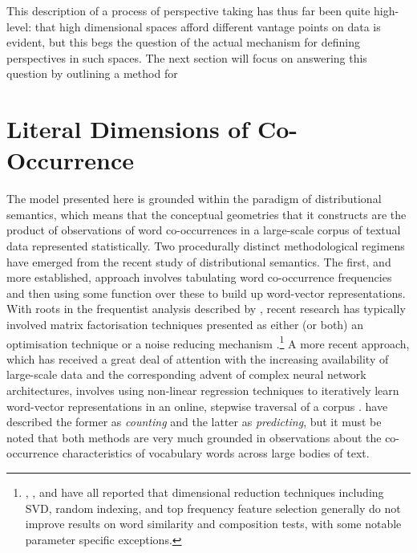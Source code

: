 {This description of a process of perspective taking has thus far been quite high-level: that high dimensional spaces afford different vantage points on data is evident, but this begs the question of the actual mechanism for defining perspectives in such spaces.  The next section will focus on answering this question by outlining a method for 

\section{Literal Dimensions of Co-Occurrence}
The model presented here is grounded within the paradigm of distributional semantics, which means that the conceptual geometries that it constructs are the product of observations of word co-occurrences in a large-scale corpus of textual data represented statistically.  Two procedurally distinct methodological regimens have emerged from the recent study of distributional semantics.  The first, and more established, approach involves tabulating word co-occurrence frequencies and then using some function over these to build up word-vector representations.  With roots in the frequentist analysis described by \cite{SaltonEA1975}, recent research has typically involved matrix factorisation techniques presented as either (or both) an optimisation technique \citep{BullinariaEA2012} or a noise reducing mechanism \citep{KielaEA2014}.\footnote{\cite{BullinariaEA2012}, \cite{LapesaEA2013}, and \cite{KielaEA2014} have all reported that dimensional reduction techniques including SVD, random indexing, and top frequency feature selection generally do not improve results on word similarity and composition tests, with some notable parameter specific exceptions.}  A more recent approach, which has received a great deal of attention with the increasing availability of large-scale data and the corresponding advent of complex neural network architectures, involves using non-linear regression techniques to iteratively learn word-vector representations in an online, stepwise traversal of a corpus \citep{BengioEA2003,CollobertEA2008,KalchbrennerEA2014}.  \cite{BaroniEA2014} have described the former as \emph{counting} and the latter as \emph{predicting}, but it must be noted that both methods are very much grounded in observations about the co-occurrence characteristics of vocabulary words across large bodies of text.

}

